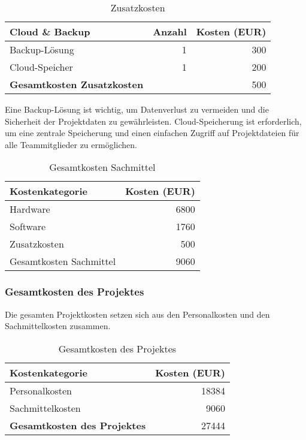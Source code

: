 \begin{table}[ht]
  \centering
  \begin{tabular}{lrr}
    \toprule
    \textbf{Cloud \& Backup} & \textbf{Anzahl} & \textbf{Kosten (EUR)} \\
    \midrule
    Backup-Lösung & 1 & 300 \\
    Cloud-Speicher & 1 & 200 \\
    \midrule
    \textbf{Gesamtkosten Zusatzkosten} & & 500 \\
    \bottomrule
  \end{tabular}
  \caption{Zusatzkosten}
\end{table}

Eine Backup-Lösung ist wichtig, um Datenverlust zu vermeiden und die Sicherheit der Projektdaten zu gewährleisten. Cloud-Speicherung ist erforderlich, um eine zentrale Speicherung und einen einfachen Zugriff auf Projektdateien für alle Teammitglieder zu ermöglichen.

\begin{table}[ht]
  \centering
  \begin{tabular}{lr}
    \toprule
    \textbf{Kostenkategorie} & \textbf{Kosten (EUR)} \\
    \midrule
    Hardware & 6800 \\
    Software & 1760 \\
    Zusatzkosten & 500 \\
    \midrule
    Gesamtkosten Sachmittel & 9060 \\
    \bottomrule
  \end{tabular}
  \caption{Gesamtkosten Sachmittel}
\end{table}

\subsubsection{Gesamtkosten des Projektes}

Die gesamten Projektkosten setzen sich aus den Personalkosten und den Sachmittelkosten zusammen.

\begin{table}[ht]
  \centering
  \begin{tabular}{lr}
    \toprule
    \textbf{Kostenkategorie} & \textbf{Kosten (EUR)} \\
    \midrule
    Personalkosten & 18384 \\
    Sachmittelkosten & 9060 \\
    \midrule
    \textbf{Gesamtkosten des Projektes} & 27444 \\
    \bottomrule
  \end{tabular}
  \caption{Gesamtkosten des Projektes}
\end{table}


